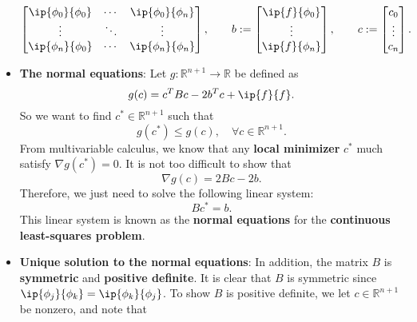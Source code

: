 \documentclass{report}
\begin{document}
\begin{itemize}
$$                \begin{bmatrix}
                    \ip{\phi_0}{\phi_0} & \cdots & \ip{\phi_0}{\phi_n} \\
                    \vdots & \ddots & \vdots\\
                    \ip{\phi_n}{\phi_0} & \cdots & \ip{\phi_n}{\phi_n} \\
                \end{bmatrix},
                \qquad
                b := 
                \begin{bmatrix}
                    \ip{f}{\phi_0}\\
                    \vdots\\
                    \ip{f}{\phi_n}\\
                \end{bmatrix},
                \qquad
                c := 
                \begin{bmatrix}
                    c_0 \\
                    \vdots\\
                    c_n \\
                \end{bmatrix}.
                $$
            \item \textbf{The normal equations}:
                Let $g \colon \mathbb{R}^{n+1} \to \mathbb{R}$ be defined as
                $$g(c) = c^T B c - 2b^Tc + \ip{f}{f}.$$
                So we want to find $c^* \in \mathbb{R}^{n+1}$ such that
                $$g(c^*) \leq g(c), \quad \forall c \in \mathbb{R}^{n+1}.$$
                From multivariable calculus, we know that any \textbf{local minimizer} $c^*$ much satisfy $\nabla g(c^*) = 0$.
                \bigbreak \noindent 
                It is not too difficult to show that 
                $$\nabla g(c) = 2Bc - 2b.$$
                Therefore, we just need to solve the following linear system:
                $$Bc^* = b.$$
                This linear system is known as the \textbf{normal equations} for the \textbf{continuous least-squares problem}.
                \bigbreak \noindent 
            \item \textbf{ Unique solution to the normal equations}:
                In addition, the matrix $B$ is \textbf{symmetric} and \textbf{positive definite}. 
                \bigbreak \noindent 
                It is clear that $B$ is symmetric since $\ip{\phi_j}{\phi_k} = \ip{\phi_k}{\phi_j}$.
                \bigbreak \noindent 
                To show $B$ is positive definite, we let $c \in \mathbb{R}^{n+1}$ be nonzero, and note that 

\end{itemize}
\end{document}
